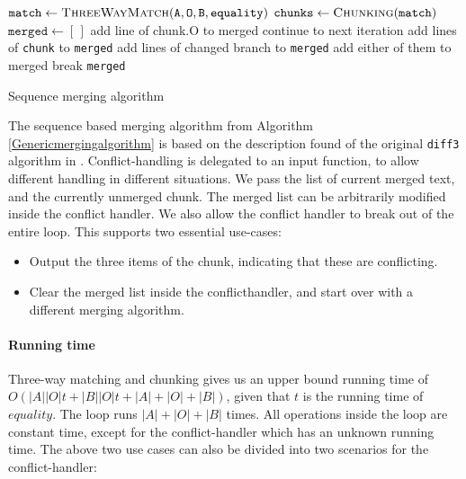 \documentclass[11pt]{article}
\begin{document}
\begin{algorithm}
\begin{algorithmic}
   \State $\texttt{match} \gets \Call{ThreeWayMatch}{\texttt{A}, \texttt{O}, \texttt{B}, \texttt{equality}}$
   \State $\texttt{chunks} \gets \Call{Chunking}{\texttt{match}}$
   \State $\texttt{merged} \gets [\,]$
            \State add line of chunk.O to merged
            \State continue to next iteration
        \EndIf
            \State add lines of \texttt{chunk} to \texttt{merged}
        \Else
               \State add lines of changed branch to \texttt{merged}
               	\State add either of them to merged
			\Else
				\State {}
					\State break
                \EndIf
			\EndIf
   		\EndIf
    \EndFor
	\State \Return \texttt{merged}
\EndFunction

\end{algorithmic}
\caption{Sequence merging algorithm}
  \label{Genericmergingalgorithm}
\end{algorithm}

The sequence based merging algorithm from Algorithm \ref{Genericmergingalgorithm} is based on the description found of the original \texttt{diff3} algorithm in \citet{Khanna}. Conflict-handling is delegated to an input function, to allow different handling in different situations. We pass the list of current merged text, and the currently unmerged chunk. The merged list can be arbitrarily modified inside the conflict handler. We also allow the conflict handler to break out of the entire loop. This supports two essential use-cases:

\begin{itemize}
   \item Output the three items of the chunk, indicating that these are conflicting.
   \item Clear the merged list inside the conflicthandler, and start over with a different merging algorithm.
\end{itemize}

\paragraph{Running time} Three-way matching and chunking gives us an upper bound running time of $O(|A||O| t + |B||O| t + |A|+|O|+|B|)$, given that $t$ is the running time of $equality$. The loop runs $|A|+|O|+|B|$ times. All operations inside the loop are constant time, except for the conflict-handler which has an unknown running time. The above two use cases can also be divided into two scenarios for the conflict-handler:
\end{document}
